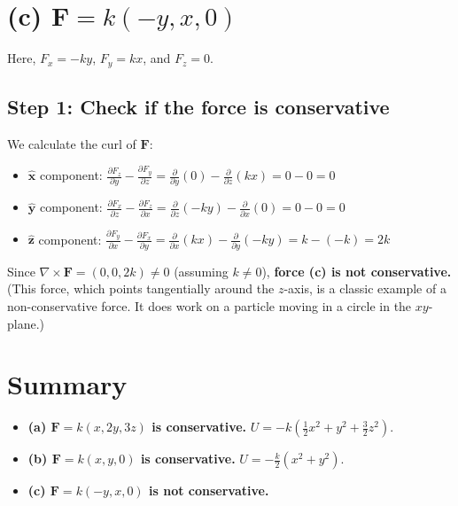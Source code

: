 \documentclass[11pt, a4paper]{article} %
\begin{document}
\hrulefill

\section*{(c) $\mathbf{F} = k(-y, x, 0)$}

Here, $F_x = -ky$, $F_y = kx$, and $F_z = 0$.

\subsection*{Step 1: Check if the force is conservative}
We calculate the curl of $\mathbf{F}$:
\begin{itemize}
    \item $\hat{\mathbf{x}}$ component: $\frac{\partial F_z}{\partial y} - \frac{\partial F_y}{\partial z} = \frac{\partial}{\partial y}(0) - \frac{\partial}{\partial z}(kx) = 0 - 0 = 0$
    \item $\hat{\mathbf{y}}$ component: $\frac{\partial F_x}{\partial z} - \frac{\partial F_z}{\partial x} = \frac{\partial}{\partial z}(-ky) - \frac{\partial}{\partial x}(0) = 0 - 0 = 0$
    \item $\hat{\mathbf{z}}$ component: $\frac{\partial F_y}{\partial x} - \frac{\partial F_x}{\partial y} = \frac{\partial}{\partial x}(kx) - \frac{\partial}{\partial y}(-ky) = k - (-k) = 2k$
\end{itemize}
Since $\nabla \times \mathbf{F} = (0, 0, 2k) \neq 0$ (assuming $k \neq 0$), \textbf{force (c) is not conservative.} \\
(This force, which points tangentially around the $z$-axis, is a classic example of a non-conservative force. It does work on a particle moving in a circle in the $xy$-plane.)

\hrulefill

\section*{Summary}
\begin{itemize}
    \item \textbf{(a) $\mathbf{F} = k(x, 2y, 3z)$ is conservative.} $U = -k(\frac{1}{2}x^2 + y^2 + \frac{3}{2}z^2)$.
    \item \textbf{(b) $\mathbf{F} = k(x, y, 0)$ is conservative.} $U = -\frac{k}{2}(x^2 + y^2)$.
    \item \textbf{(c) $\mathbf{F} = k(-y, x, 0)$ is not conservative.}
\end{itemize}

\newpage
\end{document}
